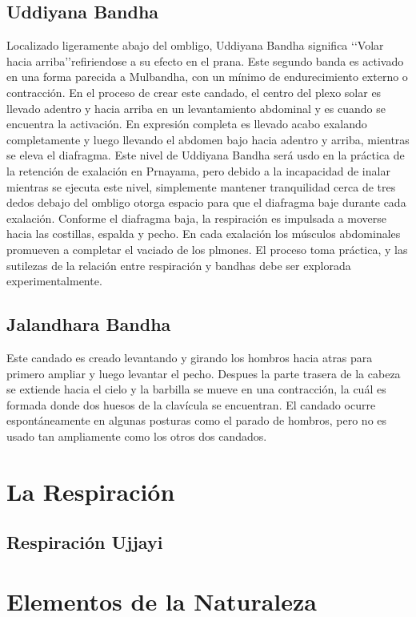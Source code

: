 \documentclass[11pt]{book}
\begin{document}
\subsection{Uddiyana Bandha}
Localizado ligeramente abajo del ombligo, Uddiyana Bandha significa \lq\lq Volar hacia arriba\rq\rq refiriendose a su efecto en el prana. Este segundo banda es activado en una forma parecida a Mulbandha, con un mínimo de endurecimiento externo o contracción. En el proceso de crear este candado, el centro del plexo solar es llevado adentro y hacia arriba en un levantamiento abdominal y es cuando se encuentra la activación. En expresión completa es llevado acabo exalando completamente y luego llevando el abdomen bajo hacia adentro y arriba, mientras se eleva el diafragma. Este nivel de Uddiyana Bandha será usdo en la práctica de la retención de exalación en Prnayama, pero debido a la incapacidad de inalar mientras se ejecuta este nivel, simplemente mantener tranquilidad cerca de tres dedos debajo del ombligo otorga espacio para que el diafragma baje durante cada exalación. Conforme el diafragma baja, la respiración es impulsada a moverse hacia las costillas, espalda y pecho. En cada exalación los músculos abdominales promueven a completar el vaciado de los plmones. El proceso toma práctica, y las sutilezas de la relación entre respiración y bandhas debe ser explorada experimentalmente.

\subsection{Jalandhara Bandha}
Este candado es creado levantando y girando los hombros  hacia atras para primero ampliar y luego levantar el pecho. Despues la parte trasera de la cabeza se extiende hacia el cielo y la barbilla se mueve en una contracción, la cuál es formada donde dos huesos de la clavícula se encuentran. El candado ocurre espontáneamente en algunas posturas como el parado de hombros, pero no es usado tan ampliamente como los otros dos candados.

\section{La Respiración}
\subsection{Respiración Ujjayi}
\section{Elementos de la Naturaleza}
\end{document}
